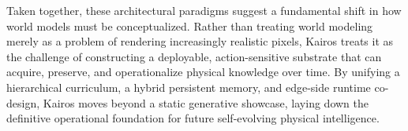Taken together, these architectural paradigms suggest a fundamental shift in how world models must be conceptualized. Rather than treating world modeling merely as a problem of rendering increasingly realistic pixels, Kairos treats it as the challenge of constructing a deployable, action-sensitive substrate that can acquire, preserve, and operationalize physical knowledge over time. By unifying a hierarchical curriculum, a hybrid persistent memory, and edge-side runtime co-design, Kairos moves beyond a static generative showcase, laying down the definitive operational foundation for future self-evolving physical intelligence.










